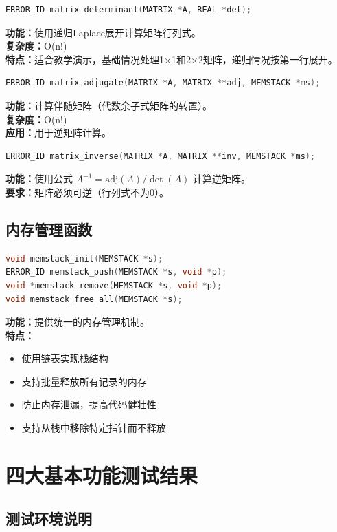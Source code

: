 \documentclass[12pt,a4paper]{article}
\begin{document}
\begin{lstlisting}[language=c]
ERROR_ID matrix_determinant(MATRIX *A, REAL *det);
\end{lstlisting}
\textbf{功能：}使用递归Laplace展开计算矩阵行列式。\\
\textbf{复杂度：}O(n!)\\
\textbf{特点：}适合教学演示，基础情况处理1×1和2×2矩阵，递归情况按第一行展开。

\begin{lstlisting}[language=c]
ERROR_ID matrix_adjugate(MATRIX *A, MATRIX **adj, MEMSTACK *ms);
\end{lstlisting}
\textbf{功能：}计算伴随矩阵（代数余子式矩阵的转置）。\\
\textbf{复杂度：}O(n!)\\
\textbf{应用：}用于逆矩阵计算。

\begin{lstlisting}[language=c]
ERROR_ID matrix_inverse(MATRIX *A, MATRIX **inv, MEMSTACK *ms);
\end{lstlisting}
\textbf{功能：}使用公式 $A^{-1} = \text{adj}(A) / \det(A)$ 计算逆矩阵。\\
\textbf{要求：}矩阵必须可逆（行列式不为0）。

\subsection{内存管理函数}

\begin{lstlisting}[language=c]
void memstack_init(MEMSTACK *s);
ERROR_ID memstack_push(MEMSTACK *s, void *p);
void *memstack_remove(MEMSTACK *s, void *p);
void memstack_free_all(MEMSTACK *s);
\end{lstlisting}
\textbf{功能：}提供统一的内存管理机制。\\
\textbf{特点：}
\begin{itemize}
    \item 使用链表实现栈结构
    \item 支持批量释放所有记录的内存
    \item 防止内存泄漏，提高代码健壮性
    \item 支持从栈中移除特定指针而不释放
\end{itemize}

\section{四大基本功能测试结果}

\subsection{测试环境说明}
\end{document}
